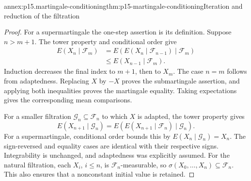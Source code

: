 \begin{annexitem}{annex:p15.martingale-conditioning}{thm:p15-martingale-conditioning}{Iteration and reduction of the filtration}
\begin{proof}
For a supermartingale the one-step assertion is its definition.
Suppose \(n>m+1\). The tower property and conditional order give
\[
 \begin{aligned}
 E(X_n\mid\mathcal F_m)
   &=E(E(X_n\mid\mathcal F_{n-1})\mid\mathcal F_m)\\
   &\leq E(X_{n-1}\mid\mathcal F_m).
 \end{aligned}
\]
Induction decreases the final index to \(m+1\), then to \(X_m\).
The case \(n=m\) follows from adaptedness.
Replacing \(X\) by \(-X\) proves the submartingale assertion,
and applying both inequalities proves the martingale equality.
Taking expectations gives the corresponding mean comparisons.

For a smaller filtration \(\mathcal G_n\subseteq\mathcal F_n\)
to which \(X\) is adapted, the tower property gives
\[
 E(X_{n+1}\mid\mathcal G_n)
       =E(E(X_{n+1}\mid\mathcal F_n)\mid\mathcal G_n).
\]
For a supermartingale, conditional order bounds this by
\(E(X_n\mid\mathcal G_n)=X_n\).
The sign-reversed and equality cases are identical with their
respective signs. Integrability is unchanged, and adaptedness
was explicitly assumed.
For the natural filtration, each \(X_i\), \(i\leq n\), is
\(\mathcal F_n\)-measurable, so
\(\sigma(X_0,\ldots,X_n)\subseteq\mathcal F_n\).
This also ensures that a nonconstant initial value is retained.
\end{proof}
\end{annexitem}

